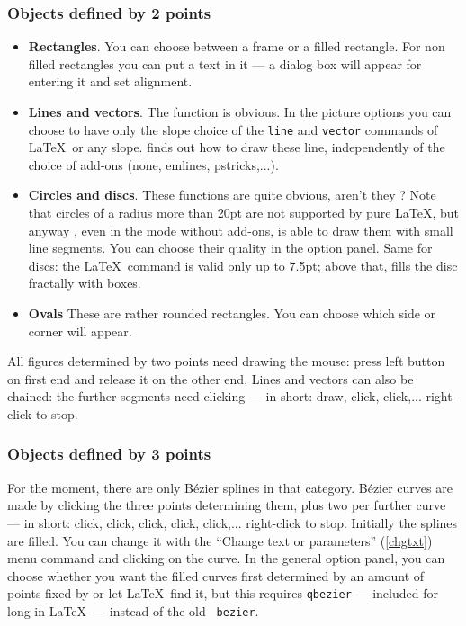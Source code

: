 \documentclass[11pt,a4paper]{article}
\begin{document}
\subsubsection{Objects defined by 2 points}
\begin{itemize}
\item {\bf Rectangles}. You can choose between a frame
or a filled rectangle. For non filled rectangles you can put a
text in it --- a dialog box will appear for entering it and set
alignment.
\item {\bf Lines and vectors}. The function is obvious. In the
picture options you can choose to have only the slope choice of
the {\tt \bs line} and {\tt \bs vector} commands of \LaTeX\, or
any slope. {\TC} finds out how to draw these line, independently
of the choice of add-ons (none, emlines, pstricks,...).
\item {\bf Circles and discs}. These functions are quite obvious,
aren't they ? Note that circles of a radius more than 20pt are
not supported by pure \LaTeX, but anyway {\TC}, even in the mode
without add-ons, is able to draw them with small line segments. You
can choose their quality in the option panel. Same for discs: the \LaTeX\,
command is valid only up to 7.5pt; above that, {\TC} fills the disc
fractally with boxes.
\item {\bf Ovals} These are rather rounded rectangles. You can
choose which side or corner will appear.
\end{itemize}
%
All figures determined by two points need drawing the mouse:
press left button on first end and release it on the other end.
Lines and vectors can also be chained: the further segments need clicking
--- in short: draw, click, click,... right-click to stop.
%
\subsubsection{Objects defined by 3 points}
%
For the moment, there are only B\'ezier splines in that category.
B\'ezier curves are made by clicking the three points determining them,
plus two per further curve
--- in short: click, click, click, click, click,... right-click to
stop.
Initially the splines are filled. You can change it with the
``Change text or parameters'' (\ref{chgtxt}) menu command and clicking on the
curve. In the general option panel, you can choose whether you want
the filled curves first determined by an amount of points fixed by {\TC} or let \LaTeX\, find it, but this requires {\tt \bs qbezier} ---
included for long in \LaTeX\, --- instead of the old {\tt \bs
bezier}.
%
\end{document}
